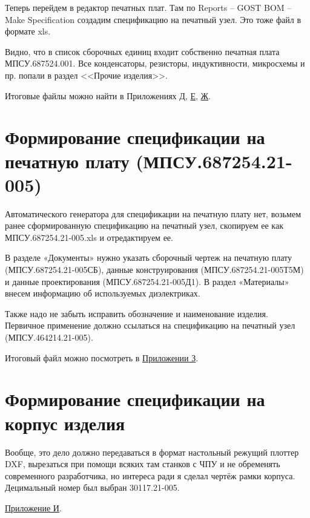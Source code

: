 Теперь  перейдем  в  редактор  печатных  плат.  Там  по  Reports  --  GOST 
BOM  --  Make  Specification  создадим  спецификацию  на  печатный  узел.  Это 
тоже файл в формате xls.

Видно,  что  в  список  сборочных  единиц  входит  собственно  печатная 
плата  МПСУ.687524.001.  Все  конденсаторы,  резисторы,  индуктивности, 
микросхемы и пр. попали в раздел <<Прочие изделия>>.

Итоговые файлы можно найти в Приложениях \hyperref[chap:appE]{Д}, \hyperref[chap:appE]{Е}, \hyperref[chap:appE]{Ж}.

\section[Формирование спецификации на печатную плату]{Формирование спецификации на печатную плату (МПСУ.687254.21-005)}

Автоматического генератора для спецификации на печатную плату нет, 
возьмем ранее сформированную спецификацию на печатный узел, скопируем 
ее как МПСУ.687254.21-005.xls и отредактируем ее. 

В разделе «Документы» нужно указать сборочный чертеж на печатную 
плату  (МПСУ.687254.21-005СБ),  данные  конструирования (МПСУ.687254.21-005Т5М) и данные проектирования (МПСУ.687254.21-005Д1). В 
раздел «Материалы» внесем информацию об используемых диэлектриках.
 
Также надо не забыть исправить обозначение и наименование изделия. 
Первичное  применение  должно  ссылаться  на  спецификацию  на  печатный 
узел (МПСУ.464214.21-005). 

Итоговый файл можно посмотреть в \hyperref[chap:appH]{Приложении З}.

\section{Формирование спецификации на корпус изделия}

Вообще, это дело должно передаваться в формат настольный режущий плоттер DXF, вырезаться при помощи всяких там станков с ЧПУ и не обременять современного разработчика, но интереса ради я сделал чертёж рамки корпуса. Децимальный номер был выбран 30117.21-005.

\hyperref[chap:appI]{Приложение И}.
